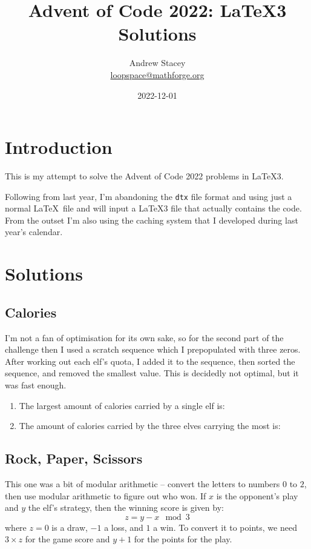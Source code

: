\documentclass{article}
\title{Advent of Code 2022: \LaTeX3 Solutions}
\author{Andrew Stacey \\ \url{loopspace@mathforge.org}}
\date{2022-12-01}
\begin{document}
\maketitle

\section{Introduction}

This is my attempt to solve the Advent of Code 2022 problems in \LaTeX3.

Following from last year, I'm abandoning the \Verb!dtx! file format and using just a normal \LaTeX\ file and will input a \LaTeX3 file that actually contains the code.
From the outset I'm also using the caching system that I developed during last year's calendar.


\section{Solutions}

\subsection{Calories}

I'm not a fan of optimisation for its own sake, so for the second part of the challenge then I used a scratch sequence which I prepopulated with three zeros.
After working out each elf's quota, I added it to the sequence, then sorted the sequence, and removed the smallest value.
This is decidedly not optimal, but it was fast enough.

\begin{enumerate}
\item The largest amount of calories carried by a single elf is: 
\item The amount of calories carried by the three elves carrying the most is: 
\end{enumerate}

\subsection{Rock, Paper, Scissors}

This one was a bit of modular arithmetic -- convert the letters to numbers \(0\) to \(2\), then use modular arithmetic to figure out who won.
If \(x\) is the opponent's play and \(y\) the elf's strategy, then the winning score is given by:
%
\[
  z = y - x \mod 3
  \]
%
where \(z = 0\) is a draw, \(-1\) a loss, and \(1\) a win.
To convert it to points, we need \(3 \times z\) for the game score and \(y + 1\) for the points for the play.
\end{document}
